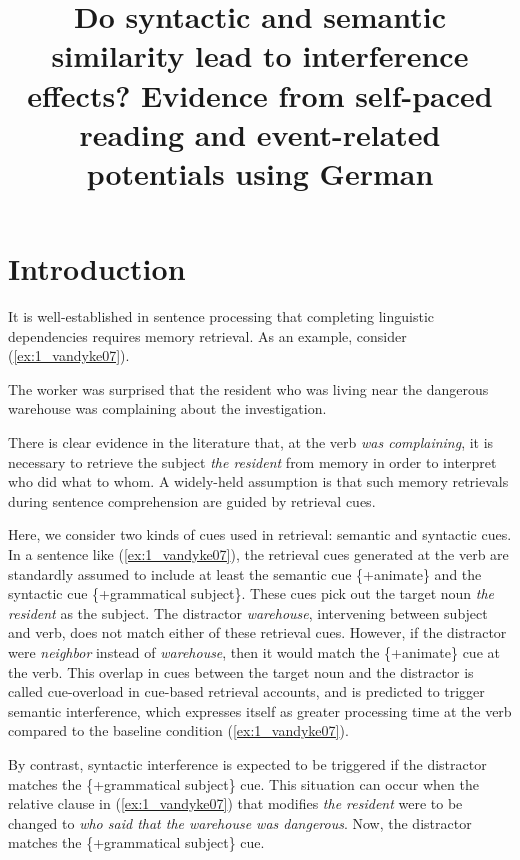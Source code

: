 \documentclass[a4paper, man, floatsintext]{apa7}
\title{\hspace{1cm} Do syntactic and semantic similarity lead to interference effects?
\newline
Evidence from self-paced reading and event-related potentials using German}
\affiliation{
Department of Linguistics, University of Potsdam}
\begin{document}
\maketitle

\section{Introduction}

It is well-established in sentence processing that completing linguistic dependencies requires memory retrieval. As an example, consider 
(\ref{ex:1_vandyke07}).

\begin{exe}[ht]
\ex \label{ex:1_vandyke07} 
The worker was surprised that the resident who was living near the dangerous warehouse was complaining about the investigation. \parencite{vandyke07}
\end{exe}

There is clear evidence in the literature  \parencite[e.g.,][]{jaeger_etal_2020, nicenboim, vandyke_mcelree06, vandyke_lewis03} that, at the verb \textit{was complaining}, it is necessary to retrieve the subject \textit{the resident} from memory in order to interpret who did what to whom. A widely-held assumption is that such memory retrievals during sentence comprehension are guided by retrieval cues. 

Here, we consider two kinds of cues used in retrieval: semantic and  syntactic cues.
In a sentence like (\ref{ex:1_vandyke07}), the retrieval cues generated at the verb are standardly assumed \parencite[e.g.,][]{vandyke07} to include at least  the semantic cue \{+animate\} and the syntactic cue \{+grammatical subject\}. These cues pick out the target noun \textit{the resident} as the subject. The distractor \textit{warehouse}, intervening between subject and verb, does not match either of these retrieval cues. However, if the distractor were \textit{neighbor} instead of \textit{warehouse}, then it would match the \{+animate\} cue at the verb. This overlap in cues between the target noun and the distractor is called cue-overload in cue-based retrieval accounts, and is predicted to trigger semantic interference, which expresses itself as greater processing time at the verb compared to the baseline condition (\ref{ex:1_vandyke07}).

By contrast, syntactic interference is expected to be triggered if the distractor matches the \{+grammatical subject\} cue. This situation can occur when the relative clause  in (\ref{ex:1_vandyke07}) that modifies \textit{the resident} were to be changed to \textit{who said that the warehouse was dangerous}. Now, the distractor matches the \{+grammatical subject\} cue. 
\end{document}

